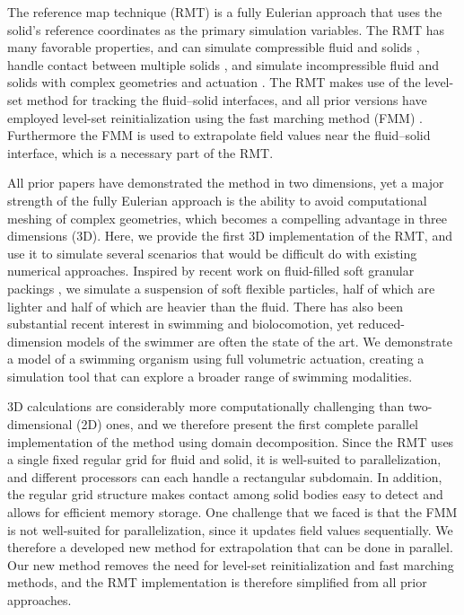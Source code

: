 \documentclass[times, 10pt]{article}
\begin{document}
\begin{multicols}{2}
The reference map technique (RMT) is a fully Eulerian approach that uses the solid's reference coordinates as the primary simulation variables. The RMT has many favorable properties, and can simulate compressible fluid and solids \cite{kamrin_thesis,kamrin12}, handle contact between multiple solids \cite{valkov15}, and simulate incompressible fluid and solids with complex geometries and actuation \cite{rycroft20}. The RMT makes use of the level-set method \cite{osher88, sethian99} for tracking the fluid--solid interfaces, and all prior versions have employed level-set reinitialization using the fast marching method (FMM) \cite{sethian99,rycroft12}. Furthermore the FMM is used to extrapolate field values near the fluid--solid interface, which is a necessary part of the RMT.

All prior papers have demonstrated the method in two dimensions, yet a major strength of the fully Eulerian approach is the ability to avoid computational meshing of complex geometries, which becomes a compelling advantage in three dimensions (3D). Here, we provide the first 3D implementation of the RMT, and use it to simulate several scenarios that would be difficult do with existing numerical approaches. Inspired by recent work on fluid-filled soft granular packings \cite{macminn15}, we simulate a suspension of soft flexible particles, half of which are lighter and half of which are heavier than the fluid. There has also been substantial recent interest in swimming and biolocomotion, yet reduced-dimension models of the swimmer \cite{tytell2010,thomases2014,olson2020} are often the state of the art. We demonstrate a model of a swimming organism using full volumetric actuation, creating a simulation tool that can explore a broader range of swimming modalities.

3D calculations are considerably more computationally challenging than two-dimensional (2D) ones, and we therefore present the first complete parallel implementation of the method using domain decomposition. Since the RMT uses a single fixed regular grid for fluid and solid, it is well-suited to parallelization, and different processors can each handle a rectangular subdomain. In addition, the regular grid structure makes contact among solid bodies easy to detect and allows for efficient memory storage.
%
One challenge that we faced is that the FMM is not well-suited for parallelization, since it updates field values sequentially. We therefore a developed new method for extrapolation that can be done in parallel. Our new method removes the need for level-set reinitialization and fast marching methods, and the RMT implementation is therefore simplified from all prior approaches.


\end{multicols}
\end{document}
